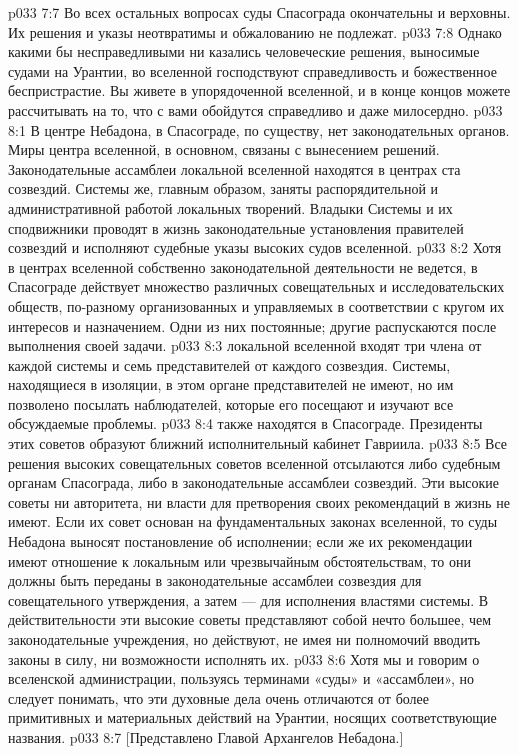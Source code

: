 \vs p033 7:7 \pc Во всех остальных вопросах суды Спасограда окончательны и верховны. Их решения и указы неотвратимы и обжалованию не подлежат.
\vs p033 7:8 Однако какими бы несправедливыми ни казались человеческие решения, выносимые судами на Урантии, во вселенной господствуют справедливость и божественное беспристрастие. Вы живете в упорядоченной вселенной, и в конце концов можете рассчитывать на то, что с вами обойдутся справедливо и даже милосердно.
\vs p033 8:1 В центре Небадона, в Спасограде, по существу, нет законодательных органов. Миры центра вселенной, в основном, связаны с вынесением решений. Законодательные ассамблеи локальной вселенной находятся в центрах ста созвездий. Системы же, главным образом, заняты распорядительной и административной работой локальных творений. Владыки Системы и их сподвижники проводят в жизнь законодательные установления правителей созвездий и исполняют судебные указы высоких судов вселенной.
\vs p033 8:2 Хотя в центрах вселенной собственно законодательной деятельности не ведется, в Спасограде действует множество различных совещательных и исследовательских обществ, по\hyp{}разному организованных и управляемых в соответствии с кругом их интересов и назначением. Одни из них постоянные; другие распускаются после выполнения своей задачи.
\vs p033 8:3 \pc {} локальной вселенной входят три члена от каждой системы и семь представителей от каждого созвездия. Системы, находящиеся в изоляции, в этом органе представителей не имеют, но им позволено посылать наблюдателей, которые его посещают и изучают все обсуждаемые проблемы.
\vs p033 8:4 \pc {} также находятся в Спасограде. Президенты этих советов образуют ближний исполнительный кабинет Гавриила.
\vs p033 8:5 \pc Все решения высоких совещательных советов вселенной отсылаются либо судебным органам Спасограда, либо в законодательные ассамблеи созвездий. Эти высокие советы ни авторитета, ни власти для претворения своих рекомендаций в жизнь не имеют. Если их совет основан на фундаментальных законах вселенной, то суды Небадона выносят постановление об исполнении; если же их рекомендации имеют отношение к локальным или чрезвычайным обстоятельствам, то они должны быть переданы в законодательные ассамблеи созвездия для совещательного утверждения, а затем --- для исполнения властями системы. В действительности эти высокие советы представляют собой нечто большее, чем законодательные учреждения, но действуют, не имея ни полномочий вводить законы в силу, ни возможности исполнять их.
\vs p033 8:6 Хотя мы и говорим о вселенской администрации, пользуясь терминами «суды» и «ассамблеи», но следует понимать, что эти духовные дела очень отличаются от более примитивных и материальных действий на Урантии, носящих соответствующие названия.
\vsetoff
\vs p033 8:7 [Представлено Главой Архангелов Небадона.]
